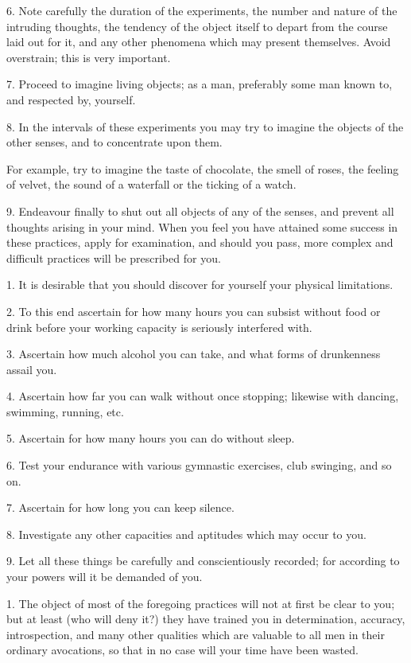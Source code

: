 6. Note carefully the duration of the experiments, the number and nature of the intruding thoughts, the tendency of the object itself to depart from the course laid out for it, and any other phenomena which may present themselves. Avoid overstrain; this is very important.

7. Proceed to imagine living objects; as a man, preferably some man known to, and respected by, yourself.

8. In the intervals of these experiments you may try to imagine the objects of the other senses, and to concentrate upon them.

For example, try to imagine the taste of chocolate, the smell of roses, the feeling of velvet, the sound of a waterfall or the ticking of a watch.

9. Endeavour finally to shut out all objects of any of the senses, and prevent all thoughts arising in your mind. When you feel you have attained some success in these practices, apply for examination, and should you pass, more complex and difficult practices will be prescribed for you.


1. It is desirable that you should discover for yourself your physical limitations.

2. To this end ascertain for how many hours you can subsist without food or drink before your working capacity is seriously interfered with.

3. Ascertain how much alcohol you can take, and what forms of drunkenness assail you.

4. Ascertain how far you can walk without once stopping; likewise with dancing, swimming, running, etc.

5. Ascertain for how many hours you can do without sleep.

6. Test your endurance with various gymnastic exercises, club swinging, and so on.

7. Ascertain for how long you can keep silence.

8. Investigate any other capacities and aptitudes which may occur to you.

9. Let all these things be carefully and conscientiously recorded; for according to your powers will it be demanded of you.


1. The object of most of the foregoing practices will not at first be clear to you; but at least (who will deny it?) they have trained you in determination, accuracy, introspection, and many other qualities which are valuable to all men in their ordinary avocations, so that in no case will your time have been wasted.

